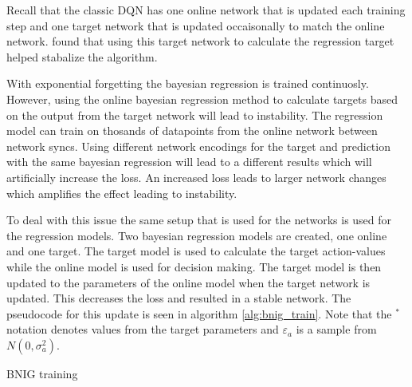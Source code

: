 Recall that the classic DQN has one online network that is updated each training step and one target network that is updated occaisonally to match the online network. \cite{mnih_2013} found that using this target network to calculate the regression target helped stabalize the algorithm.

With exponential forgetting the bayesian regression is trained continuosly. However, using the online bayesian regression method to calculate targets based on the output from the target network will lead to instability. The regression model can train on thosands of datapoints from the online network between network syncs. Using different network encodings for the target and prediction with the same bayesian regression will lead to a different results which will artificially increase the loss. An increased loss leads to larger network changes which amplifies the effect leading to instability.

To deal with this issue the same setup that is used for the networks is used for the regression models. Two bayesian regression models are created, one online and one target. The target model is used to calculate the target action-values while the online model is used for decision making. The target model is then updated to the parameters of the online model when the target network is updated. This decreases the loss and resulted in a stable network. The pseudocode for this update is seen in algorithm \ref{alg:bnig_train}. Note that the $^*$ notation denotes values from the target parameters and $\varepsilon_a$ is a sample from $N(0,\sigma^2_a)$.

\begin{algorithm}[H]
    \caption{BNIG training}
    \label{alg:bnig_train}
\end{algorithm}

